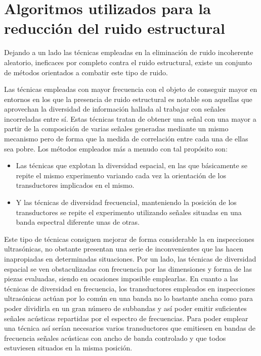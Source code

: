 \section[Algoritmos para la reducción del ruido estructural]{Algoritmos
utilizados para la reducción del ruido estructural}

Dejando a un lado las técnicas empleadas en la eliminación de ruido
incoherente aleatorio, ineficaces por completo contra el ruido estructural,
existe un conjunto de métodos orientados a combatir este tipo de ruido.

Las técnicas empleadas con mayor frecuencia con el objeto de conseguir
mayor  en entornos en los que la presencia de ruido estructural es
notable son aquellas que aprovechan la diversidad de información hallada al
trabajar con señales incorreladas entre sí. Estas técnicas tratan de
obtener una señal con una mayor  a partir de la composición de
varias señales generadas mediante un mismo mecanismo pero de forma que la
medida de correlación entre cada una de ellas sea pobre. Los métodos
empleados más a menudo con tal propósito son:

\begin{itemize}
	\item Las técnicas que explotan la diversidad espacial, en las que
		básicamente se repite el mismo experimento variando cada
		vez la orientación de los transductores implicados en el
		mismo.
	\item Y las técnicas de diversidad frecuencial, manteniendo la
		posición de los transductores se repite el experimento
		utilizando señales situadas en una banda espectral
		diferente unas de otras.
\end{itemize}

Este tipo de técnicas consiguen mejorar de forma considerable la 
en inspecciones ultrasónicas, no obstante presentan una serie de
inconvenientes que las hacen inapropiadas en determinadas situaciones. Por
un lado, las técnicas de diversidad espacial se ven obstaculizadas con
frecuencia por las dimensiones y forma de las piezas evaluadas, siendo en
ocasiones imposible emplearlas. En cuanto a las técnicas de diversidad en
frecuencia, los transductores empleados en inspecciones ultrasónicas actúan
por lo común en una banda no lo bastante ancha como para poder dividirla en
un gran número de subbandas y así poder emitir suficientes señales
acústicas repartidas por el espectro de frecuencias. Para poder emplear una
técnica así serían necesarios varios transductores que emitiesen en bandas
de frecuencia señales acústicas con ancho de banda controlado y que todos
estuviesen situados en la misma posición.

